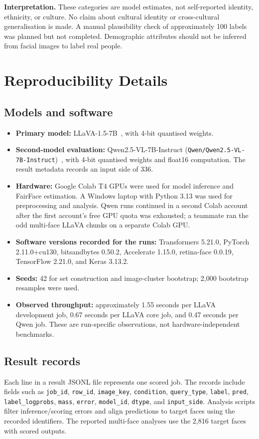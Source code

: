 \documentclass[lettersize,journal]{IEEEtran}
\begin{document}
\textbf{Interpretation.} These categories are model estimates, not self-reported identity, ethnicity, or culture. No claim about cultural identity or cross-cultural generalisation is made. A manual plausibility check of approximately 100 labels was planned but not completed. Demographic attributes should not be inferred from facial images to label real people.

\section{Reproducibility Details}
\label{app:repro}
\subsection{Models and software}
\begin{itemize}
\item \textbf{Primary model:} LLaVA-1.5-7B~\cite{liu2024llava15}, with 4-bit quantised weights.
\item \textbf{Second-model evaluation:} Qwen2.5-VL-7B-Instruct (\texttt{Qwen/Qwen2.5-VL-7B-Instruct})~\cite{bai2025qwen25vl}, with 4-bit quantised weights and float16 computation. The result metadata records an input side of 336.
\item \textbf{Hardware:} Google Colab T4 GPUs were used for model inference and FairFace estimation. A Windows laptop with Python 3.13 was used for preprocessing and analysis. Qwen runs continued in a second Colab account after the first account's free GPU quota was exhausted; a teammate ran the odd multi-face LLaVA chunks on a separate Colab GPU.
\item \textbf{Software versions recorded for the runs:} Transformers 5.21.0, PyTorch 2.11.0+cu130, bitsandbytes 0.50.2, Accelerate 1.15.0, retina-face 0.0.19, TensorFlow 2.21.0, and Keras 3.13.2.
\item \textbf{Seeds:} 42 for set construction and image-cluster bootstrap; 2,000 bootstrap resamples were used.
\item \textbf{Observed throughput:} approximately 1.55 seconds per LLaVA development job, 0.67 seconds per LLaVA core job, and 0.47 seconds per Qwen job. These are run-specific observations, not hardware-independent benchmarks.
\end{itemize}

\subsection{Result records}
Each line in a result JSONL file represents one scored job. The records include fields such as \texttt{job\_id}, \texttt{row\_id}, \texttt{image\_key}, \texttt{condition}, \texttt{query\_type}, \texttt{label}, \texttt{pred}, \texttt{label\_logprobs}, \texttt{mass}, \texttt{error}, \texttt{model\_id}, \texttt{dtype}, and \texttt{input\_side}. Analysis scripts filter inference/scoring errors and align predictions to target faces using the recorded identifiers. The reported multi-face analyses use the 2,816 target faces with scored outputs.




\balance
\end{document}
